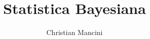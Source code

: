 \documentclass[]{article}
\title{Statistica Bayesiana}
\author{Christian Mancini}
\begin{document}
\maketitle

\begin{abstract}

\end{abstract}

\section{}
\end{document}
